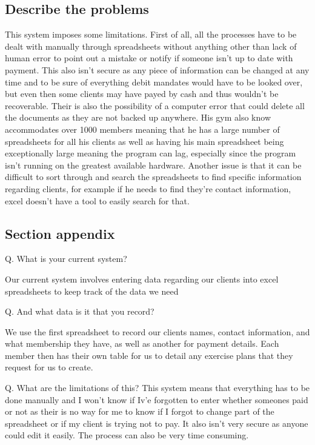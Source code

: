 \subsection{Describe the problems}

This system imposes some limitations. First of all, all the processes have to be dealt with manually through spreadsheets without anything other than lack of human error to point out a mistake or notify if someone isn't up to date with payment. This also isn't secure as any piece of information can be changed at any time and to be sure of everything debit mandates would have to be looked over, but even then some clients may have payed by cash and thus wouldn't be recoverable. Their is also the possibility of a computer error that could delete all the documents as they are not backed up anywhere. His gym also know accommodates over 1000 members meaning that he has a large number of spreadsheets for all his clients as well as having his main spreadsheet being exceptionally large meaning the program can lag, especially since the program isn't running on the greatest available hardware. Another issue is that it can be difficult to sort through and search the spreadsheets to find specific information regarding clients, for example if he needs to find they're contact information, excel doesn't have a tool to easily search for that.

\subsection{Section appendix}

Q. What is your current system?

Our current system involves entering data regarding our clients into excel spreadsheets to keep track of the data we need

Q. And what data is it that you record?

We use the first spreadsheet to record our clients names, contact information, and what membership they have, as well as another for payment details. Each member then has their own table for us to detail any exercise plans that they request for us to create. 

Q. What are the limitations of this?
This system means that everything has to be done manually and I won't know if Iv'e forgotten to enter whether someones paid or not as their is no way for me to know if I forgot to change part of the spreadsheet or if my client is trying not to pay. It also isn't very secure as anyone could edit it easily. The process can also be very time consuming.


